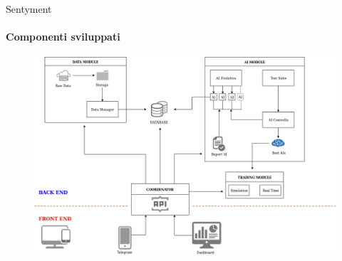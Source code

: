 \documentclass{beamer}
\begin{document}
\begin{frame}{Sentyment}
\framesubtitle{Componenti sviluppati}
\begin{figure}
        \centering
        \includegraphics[width=.9\linewidth]{Sentyment}
\end{figure}
\end{frame}
\end{document}

